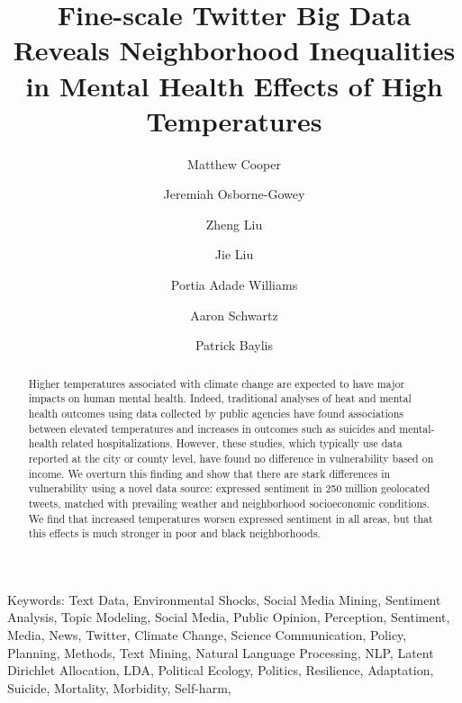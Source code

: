 \documentclass{article}
\begin{document}
\title{Fine-scale Twitter Big Data Reveals Neighborhood Inequalities in Mental Health Effects of High Temperatures}

\author[1, *]{Matthew Cooper}
\author[2]{Jeremiah Osborne-Gowey}
\author[3]{Zheng Liu}
\author[4]{Jie Liu}
\author[5]{Portia Adade Williams}
\author[6]{Aaron Schwartz}
\author[7]{Patrick Baylis}


\maketitle

\begin{abstract}
Higher temperatures associated with climate change are expected to have major impacts on human mental health.  Indeed, traditional analyses of heat and mental health outcomes using data collected by public agencies have found associations between elevated temperatures and increases in outcomes such as suicides and mental-health related hospitalizations.  However, these studies, which typically use data reported at the city or county level, have found no difference in vulnerability based on income.  We overturn this finding and show that there are stark differences in vulnerability using a novel data source: expressed sentiment in 250 million geolocated tweets, matched with prevailing weather and neighborhood socioeconomic conditions.  We find that increased temperatures worsen expressed sentiment in all areas, but that this effects is much stronger in poor and black neighborhoods.

\end{abstract}

Keywords: Text Data, Environmental Shocks, Social Media Mining, Sentiment Analysis, Topic Modeling, Social Media, Public Opinion, Perception, Sentiment, Media, News, Twitter, Climate Change, Science Communication, Policy, Planning, Methods, Text Mining, Natural Language Processing, NLP, Latent Dirichlet Allocation, LDA, Political Ecology, Politics, Resilience, Adaptation, Suicide, Mortality, Morbidity, Self-harm, 
\end{document}
